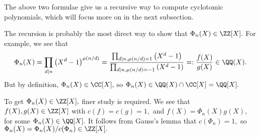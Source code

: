 The above two formulae give us a recursive way to compute cyclotomic polynomials, which will focus more on in the next subsection.
\begin{remark}[Nir]
	The recursion is probably the most direct way to show that $\Phi_n(X)\in\ZZ[X].$ For example, we see that
	\[\Phi_n(X)=\prod_{d\mid n}\left(X^d-1\right)^{\mu(n/d)}=\frac{\prod_{d\mid n,\mu(n/d)=1}\left(X^d-1\right)}{\prod_{d\mid n,\mu(n/d)=-1}\left(X^d-1\right)}=:\frac{f(X)}{g(X)}\in\QQ(X).\]
	But by definition, $\Phi_n(X)\in\CC[X],$ so $\Phi_n(X)\in\QQ(X)\cap\CC[X]=\QQ[X].$
	
	To get $\Phi_n(X)\in\ZZ[X],$ finer study is required. We see that $f(X),g(X)\in\ZZ[X]$ with $c(f)=c(g)=1,$ and $f(X)=\Phi_n(X)g(X),$ for some $\Phi_n(X)\in\QQ[X].$ It follows from Gauss's lemma that $c(\Phi_n)=1,$ so $\Phi_n(X)=\Phi_n(X)/c(\Phi_n)\in\ZZ[X].$
\end{remark}

